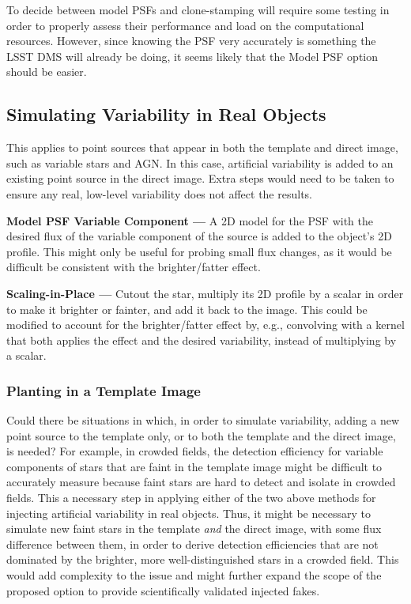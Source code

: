 To decide between model PSFs and clone-stamping will require some testing in order to properly assess their performance and load on the computational resources. However, since knowing the PSF very accurately is something the LSST DMS will already be doing, it seems likely that the Model PSF option should be easier.

\subsection{Simulating Variability in Real Objects}\label{ssec:tech_pre}

This applies to point sources that appear in both the template and direct image, such as variable stars and AGN. In this case, artificial variability is added to an existing point source in the direct image. Extra steps would need to be taken to ensure any real, low-level variability does not affect the results.

{\bf Model PSF Variable Component ---} A 2D model for the PSF with the desired flux of the variable component of the source is added to the object's 2D profile. This might only be useful for probing small flux changes, as it would be difficult be consistent with the brighter/fatter effect.

{\bf Scaling-in-Place ---} Cutout the star, multiply its 2D profile by a scalar in order to make it brighter or fainter, and add it back to the image. This could be modified to account for the brighter/fatter effect by, e.g., convolving with a kernel that both applies the effect and the desired variability, instead of multiplying by a scalar.

\subsubsection{Planting in a Template Image}\label{ssec:tech_pre_temp}

Could there be situations in which, in order to simulate variability, adding a new point source to the template only, or to both the template and the direct image, is needed? For example, in crowded fields, the detection efficiency for variable components of stars that are faint in the template image might be difficult to accurately measure because faint stars are hard to detect and isolate in crowded fields. This a necessary step in applying either of the two above methods for injecting artificial variability in real objects. Thus, it might be necessary to simulate new faint stars in the template {\it and} the direct image, with some flux difference between them, in order to derive detection efficiencies that are not dominated by the brighter, more well-distinguished stars in a crowded field. This would add complexity to the issue and might further expand the scope of the proposed option to provide scientifically validated injected fakes. 

